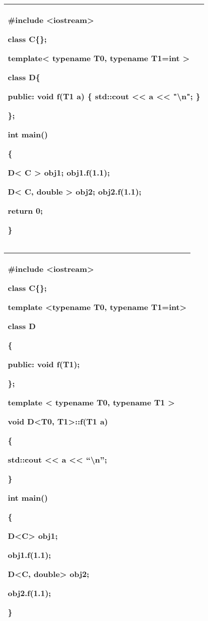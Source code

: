 \documentclass[
]{article}
\begin{document}
\begin{longtable}[]{@{}l@{}}
\toprule
\endhead
\begin{minipage}[t]{0.97\columnwidth}\raggedright
\#include \textless iostream\textgreater{}

class C\{\};

template\textless{} typename T0, \textbf{typename T1=int} \textgreater{}

class D\{

public: void f(T1 a) \{ std::cout \textless\textless{} a
\textless\textless{} "\textbackslash n"; \}

\};

int main()

\{

\textbf{D\textless{} C \textgreater{}} obj1; obj1.f(1.1);

\textbf{D\textless{} C, double \textgreater{}} obj2; obj2.f(1.1);

return 0;

\}\strut
\end{minipage}\tabularnewline
\bottomrule
\end{longtable}

\begin{longtable}[]{@{}l@{}}
\toprule
\endhead
\begin{minipage}[t]{0.97\columnwidth}\raggedright
\#include \textless iostream\textgreater{}

class C\{\};

template \textless typename T0, typename T1=int\textgreater{}

class D

\{

public: void f(T1);

\};

template \textless{} typename T0, typename T1 \textgreater{}

void D\textless T0, T1\textgreater::f(T1 a)

\{

std::cout \textless\textless{} a \textless\textless{}
``\textbackslash n'';

\}

int main()

\{

D\textless C\textgreater{} obj1;

obj1.f(1.1);

D\textless C, double\textgreater{} obj2;

obj2.f(1.1);

\}\strut
\end{minipage}\tabularnewline
\bottomrule
\end{longtable}
\end{document}
